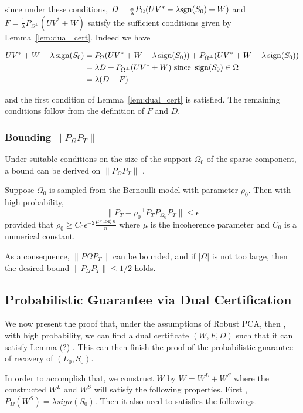 since under these conditions, $D = \frac{1}{\lambda} P_\Omega (UV^* - \lambda \text{sgn}(S_0) + W)$ and $F = \frac{1}{\lambda} P_{\Omega^\perp} (UV^* + W)$ satisfy the sufficient conditions given by Lemma~\ref{lem:dual_cert}. Indeed we have

\begin{align*}
UV^* + W - \lambda \operatorname{sign}(S_0)
&= P_\Omega (UV^* + W - \lambda \operatorname{sign}(S_0))+ P_{\Omega^\perp} (UV^* + W - \lambda \operatorname{sign}(S_0)) \\
&= \lambda D+ P_{\Omega^\perp} (UV^* + W) \text{ since } \operatorname{sign}(S_0) \in \Omega\\
&= \lambda (D+F)
\end{align*}

and the first condition of Lemma~\ref{lem:dual_cert} is satisfied. The remaining conditions follow from the definition of $F$ and $D$.
\fi

\subsubsection{Bounding $\|P_\Omega P_T\|$}
 Under suitable conditions on the size of the support $\Omega_0$ of the sparse component, a bound can be derived on  $\|P_\Omega P_T\|$ \cite{Candes:2009uq}.
\begin{theorem}
Suppose $\Omega_0$ is sampled from the Bernoulli model with parameter $\rho_0$. Then with high probability,
\[
\|P_T - \rho_0^{-1} P_T P_{\Omega_0} P_T\| \leq \epsilon
\]
provided that $\rho_0 \geq C_0 \epsilon^{-2} \frac{\mu r \log n}{n}$ where $\mu$ is the incoherence parameter and $C_0$ is a numerical constant.
\end{theorem}

As a consequence, $\|P\Omega P_T\|$ can be bounded, and if $|\Omega|$ is not too large, then the desired bound $\|P_\Omega P_T\| \leq 1/2$ holds.

\subsection{Probabilistic Guarantee via Dual Certification}

We now present the proof that, under the assumptions of Robust PCA,
then , with high probability, we can find a dual certificate $(W,F,D)$
such that it can satisfy Lemma (?) . This can then finish the proof
of the probabilistic guarantee of recovery of $(L_{0},S_{0})$.

In order to accomplish that, we construct $W$ by $W=W^{L}+W^{S}$
where the constructed $W^{L}$ and $W^{S}$ will satisfy the following
properties. First , $P_{\Omega}(W^{S})=\lambda sign(S_{0})$. Then
it also need to satisfies the followings.

